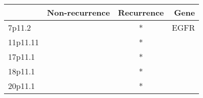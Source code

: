 \begin{tabular}{lccr}
\toprule
{} & Non-recurrence & Recurrence &  Gene \\
\midrule
7p11.2   &                &          * &  EGFR \\
11p11.11 &                &          * &       \\
17p11.1  &                &          * &       \\
18p11.1  &                &          * &       \\
20p11.1  &                &          * &       \\
\bottomrule
\end{tabular}
